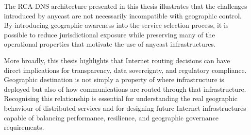 The RCA-DNS architecture presented in this thesis illustrates that the challenges introduced by anycast are not necessarily incompatible with geographic control. By introducing geographic awareness into the service selection process, it is possible to reduce jurisdictional exposure while preserving many of the operational properties that motivate the use of anycast infrastructures.

More broadly, this thesis highlights that Internet routing decisions can have direct implications for transparency, data sovereignty, and regulatory compliance. Geographic destination is not simply a property of where infrastructure is deployed but also of how communications are routed through that infrastructure. Recognising this relationship is essential for understanding the real geographic behaviour of distributed services and for designing future Internet infrastructures capable of balancing performance, resilience, and geographic governance requirements.
